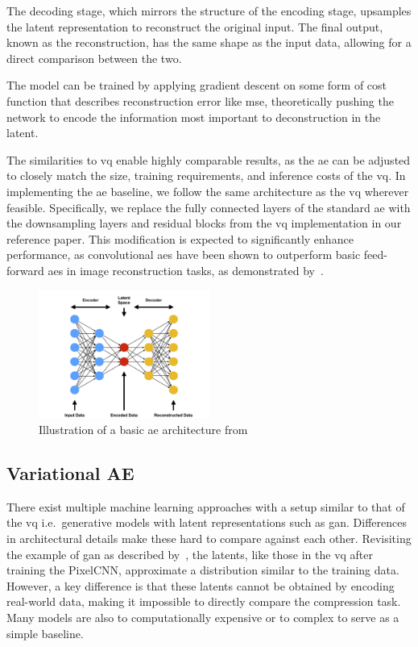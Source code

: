 The decoding stage, which mirrors the structure of the encoding stage, upsamples the latent representation to reconstruct the original input.
The final output, known as the reconstruction, has the same shape as the input data, allowing for a direct comparison between the two.

The model can be trained by applying gradient descent on some form of cost function that describes reconstruction error
like \ac{mse}, theoretically pushing the network to encode the information most important to deconstruction in the
latent.

The similarities to \ac{vq} enable highly comparable results, as the \ac{ae} can be adjusted to closely match the
size, training requirements, and inference costs of the \ac{vq}.
In implementing the \ac{ae} baseline, we follow the same architecture as the \ac{vq} wherever feasible.
Specifically, we replace the fully connected layers of the standard \ac{ae} with the downsampling layers and
residual blocks from the \ac{vq} implementation in our reference paper.
This modification is expected to significantly enhance performance, as convolutional \ac{ae}s have been shown to
outperform basic feed-forward \ac{ae}s in image reconstruction tasks, as demonstrated by~\cite{convae}.

\begin{figure}[H]
    \centering
    \includegraphics[width=0.5\textwidth]{images/ae}
    \caption{Illustration of a basic \ac{ae} architecture from~\cite{ae_pic}}
    \label{fig:ae}
\end{figure}

\subsection{Variational AE}\label{subsec:variational-ae}
There exist multiple machine learning approaches with a setup similar to that of the \ac{vq}
i.e.\ generative models with latent representations such as \ac{gan}.
Differences in architectural details make these hard to compare against each other.
Revisiting the example of \ac{gan} as described by~\cite{gan}, the latents, like those in the \ac{vq} after
training the PixelCNN, approximate a distribution similar to the training data.
However, a key difference is that these latents cannot be obtained by encoding real-world data, making it impossible to
directly compare the compression task.
Many models are also to computationally expensive or to complex to serve as a simple baseline.

